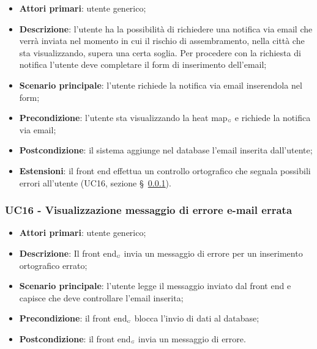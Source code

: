 \begin{itemize}
	\item \textbf{Attori primari}: utente generico;
	\item \textbf{Descrizione}: l'utente ha la possibilità di richiedere una notifica via email che verrà inviata nel momento in cui il rischio di assembramento, nella città che sta visualizzando, supera una certa soglia. Per procedere con la richiesta di notifica l'utente deve completare il form di inserimento dell'email;
	\item \textbf{Scenario principale}: l'utente richiede la notifica via email inserendola nel form;
	\item \textbf{Precondizione}: l'utente sta visualizzando la heat map$_{\scaleto{G}{3pt}}$ e richiede la notifica via email;
	\item \textbf{Postcondizione}: il sistema aggiunge nel database l'email inserita dall'utente;
	\item \textbf{Estensioni}: il front end effettua un controllo ortografico che segnala possibili errori all'utente (UC16, sezione \S~\ref{CasiDUsoCasiDUsoFacoltativiTraUnUtenteEIlFrontEndElencoCasiDUsoUC16VisualizzazioneMessaggioDiErroreEmailErrata}).
\end{itemize}

\subsubsection{UC16 - Visualizzazione messaggio di errore e-mail errata}\label{CasiDUsoCasiDUsoFacoltativiTraUnUtenteEIlFrontEndElencoCasiDUsoUC16VisualizzazioneMessaggioDiErroreEmailErrata}

\begin{itemize}
	\item \textbf{Attori primari}: utente generico;
	\item \textbf{Descrizione}: Il front end$_{\scaleto{G}{3pt}}$ invia un messaggio di errore per un inserimento ortografico errato;
	\item \textbf{Scenario principale}: l'utente legge il messaggio inviato dal front end e capisce che deve controllare l'email inserita;
	\item \textbf{Precondizione}: il front end$_{\scaleto{G}{3pt}}$ blocca l'invio di dati al database;
	\item \textbf{Postcondizione}: il front end$_{\scaleto{G}{3pt}}$ invia un messaggio di errore.
\end{itemize}



